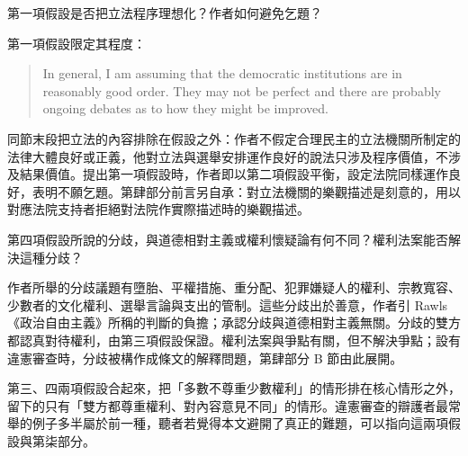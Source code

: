 
\begin{qaquestion}
第一項假設是否把立法程序理想化？作者如何避免乞題？
\end{qaquestion}

第一項假設限定其程度：

\begin{quote}
In general, I am assuming that the democratic institutions are in reasonably good order. They may not be perfect and there are probably ongoing debates as to how they might be improved.
\end{quote}

同節末段把立法的內容排除在假設之外：作者不假定合理民主的立法機關所制定的法律大體良好或正義，他對立法與選舉安排運作良好的說法只涉及程序價值，不涉及結果價值。提出第一項假設時，作者即以第二項假設平衡，設定法院同樣運作良好，表明不願乞題。第肆部分前言另自承：對立法機關的樂觀描述是刻意的，用以對應法院支持者拒絕對法院作實際描述時的樂觀描述。


\begin{qaquestion}
第四項假設所說的分歧，與道德相對主義或權利懷疑論有何不同？權利法案能否解決這種分歧？
\end{qaquestion}

作者所舉的分歧議題有墮胎、平權措施、重分配、犯罪嫌疑人的權利、宗教寬容、少數者的文化權利、選舉言論與支出的管制。這些分歧出於善意，作者引 Rawls《政治自由主義》所稱的判斷的負擔；承認分歧與道德相對主義無關。分歧的雙方都認真對待權利，由第三項假設保證。權利法案與爭點有關，但不解決爭點；設有違憲審查時，分歧被構作成條文的解釋問題，第肆部分 B 節由此展開。

\begin{readernote}
第三、四兩項假設合起來，把「多數不尊重少數權利」的情形排在核心情形之外，留下的只有「雙方都尊重權利、對內容意見不同」的情形。違憲審查的辯護者最常舉的例子多半屬於前一種，聽者若覺得本文避開了真正的難題，可以指向這兩項假設與第柒部分。
\end{readernote}
